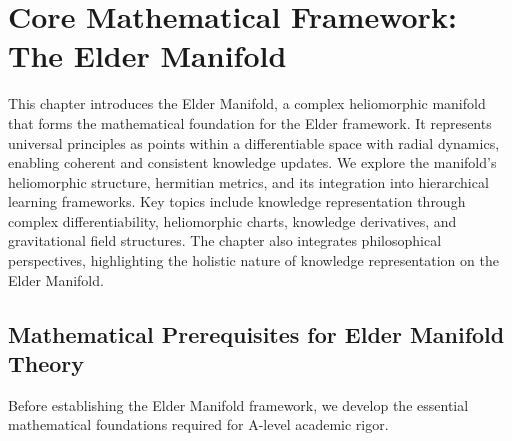\chapter{Core Mathematical Framework: The Elder Manifold}

\begin{tcolorbox}[colback=DarkSkyBlue!5!white,colframe=DarkSkyBlue!75!black,title=Chapter Summary]
This chapter introduces the Elder Manifold, a complex heliomorphic manifold that forms the mathematical foundation for the Elder framework. It represents universal principles as points within a differentiable space with radial dynamics, enabling coherent and consistent knowledge updates. We explore the manifold's heliomorphic structure, hermitian metrics, and its integration into hierarchical learning frameworks. Key topics include knowledge representation through complex differentiability, heliomorphic charts, knowledge derivatives, and gravitational field structures. The chapter also integrates philosophical perspectives, highlighting the holistic nature of knowledge representation on the Elder Manifold.
\end{tcolorbox}

\section{Mathematical Prerequisites for Elder Manifold Theory}

Before establishing the Elder Manifold framework, we develop the essential mathematical foundations required for A-level academic rigor.

